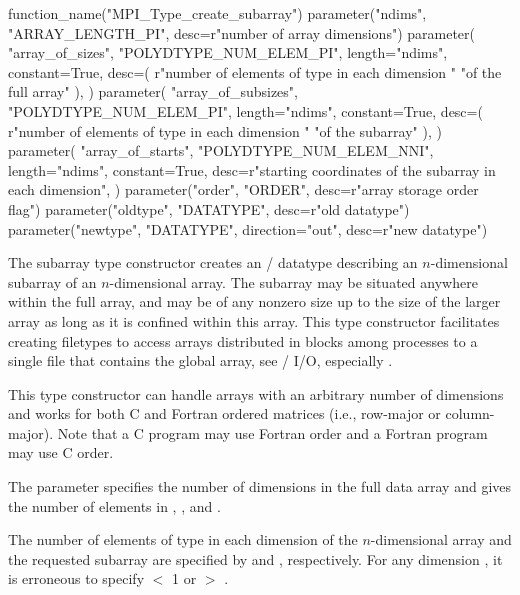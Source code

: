 \begin{mpi-binding}
    function_name("MPI_Type_create_subarray")
    parameter("ndims", "ARRAY_LENGTH_PI", desc=r"number of array dimensions")
    parameter(
        "array_of_sizes",
        "POLYDTYPE_NUM_ELEM_PI",
        length="ndims",
        constant=True,
        desc=(
            r"number of elements of type  in each dimension "
            "of the full array"
        ),
    )
    parameter(
        "array_of_subsizes",
        "POLYDTYPE_NUM_ELEM_PI",
        length="ndims",
        constant=True,
        desc=(
            r"number of elements of type  in each dimension "
            "of the subarray"
        ),
    )
    parameter(
        "array_of_starts",
        "POLYDTYPE_NUM_ELEM_NNI",
        length="ndims",
        constant=True,
        desc=r"starting coordinates of the subarray in each dimension",
    )
    parameter("order", "ORDER", desc=r"array storage order flag")
    parameter("oldtype", "DATATYPE", desc=r"old datatype")
    parameter("newtype", "DATATYPE", direction="out", desc=r"new datatype")
\end{mpi-binding}

The subarray type constructor creates an \MPI/ datatype
describing an
$n$-dimensional
subarray of an
$n$-dimensional
array.
The subarray may be situated anywhere within the full array,
and may be of any nonzero size up to the size of the larger array
as long as it is confined within this array.
This type constructor facilitates creating filetypes to access
arrays distributed in blocks among processes to a
single file that contains the global array,
see \MPI/ I/O, especially .

This type constructor can handle arrays with an arbitrary number of
dimensions and works for both C and Fortran ordered matrices
(i.e., row-major or column-major).  Note that a C program may use Fortran
order and a Fortran program may use C order.


The  parameter specifies the number of dimensions in the full
data array and gives the number of elements in
, ,
and .

The number of elements of type  in
each dimension of the
$n$-dimensional
array and the
requested subarray are specified by
 and ,
respectively.
For any dimension
,
it is erroneous to specify
 $<$ 1 or
 $>$ .


